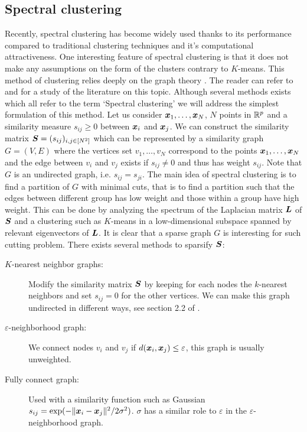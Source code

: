 \subsection{Spectral clustering}
Recently, spectral clustering has become widely used thanks to its performance compared to traditional clustering techniques and it's computational attractiveness. One interesting feature of spectral clustering is that it does not make any assumptions on the form of the clusters contrary to $K$-means. This method of clustering relies deeply on the graph theory \citep{Donath:1973:LBP:1664638.1664644,Fiedler1973}. The reader can refer to \citep{Luxburg:2007:TSC:1288822.1288832} and \citep{SPIELMAN2007284} for a study of the literature on this topic. Although several methods exists which all refer to the term `Spectral clustering' we will address the simplest formulation of this method. Let us consider $\boldsymbol x_1,\dots,\boldsymbol x_N$, $N$ points in ${\mathbb R}^p$ and a similarity measure $s_{ij} \geq 0$ between $\boldsymbol x_i$ and $\boldsymbol x_j$. We can construct the similarity matrix $\boldsymbol S=(s_{ij})_{i,j\in [N^2]}$ which can be represented by a similarity graph $G=(V,E)$ where the vertices set $v_1,\dots,v_N$ correspond to the points $\boldsymbol x_1,\dots,\boldsymbol x_N$ and the edge between $v_i$ and $v_j$ exists if $s_{ij}\neq 0 $ and thus has weight $s_{ij}$. Note that $G$ is an undirected graph, i.e. $s_{ij}=s_{ji}$. The main idea of spectral clustering is to find a partition of $G$ with minimal cuts, that is to find a partition such that the edges between different group has low weight and those within a group have high weight. This can be done by analyzing the spectrum of the Laplacian matrix $\boldsymbol L$ of $\boldsymbol S$ and a clustering such as $K$-means in a low-dimensional subspace spanned by relevant eigenvectors of $\boldsymbol L$. It is clear that a sparse graph $G$ is interesting for such cutting problem. There exists several methods to sparsify $\boldsymbol S$: 
\begin{description}
\item[$K$-nearest neighbor graphs:] Modify the similarity matrix $\boldsymbol S$ by keeping for each nodes the $k$-nearest neighbors and set $s_{ij}=0$ for the other vertices. We can make this graph undirected in different ways, see section 2.2 of \citep{Luxburg:2007:TSC:1288822.1288832}.
\item[$\varepsilon$-neighborhood graph:] We connect nodes $v_i$ and $v_j$ if $d(\boldsymbol x_i,\boldsymbol x_j)\leq \varepsilon$, this graph is usually unweighted.
\item[Fully connect graph:] Used with a similarity function such as Gaussian $s_{ij}=\exp(-\|\boldsymbol x_i-\boldsymbol x_j\|^2/2\sigma^2)$. $\sigma$ has a similar role to $\varepsilon$ in the $\varepsilon$-neighborhood graph.
\end{description}
